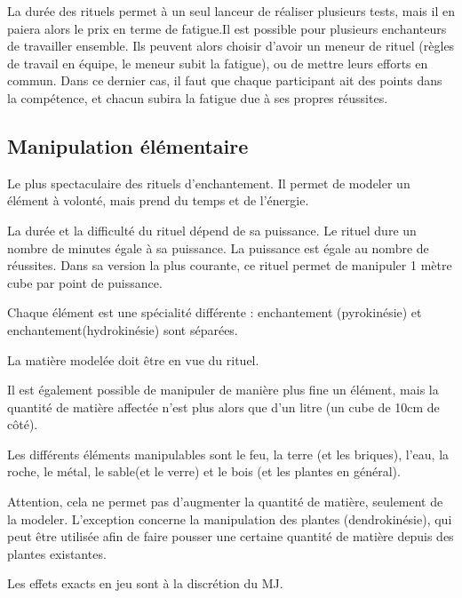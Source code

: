 \documentclass[10pt,a4paper,twocolumn]{book}
\begin{document}
La durée des rituels permet à un seul lanceur de réaliser plusieurs tests, mais il en paiera alors le prix en terme de fatigue.Il est possible pour plusieurs enchanteurs de travailler ensemble. Ils peuvent alors choisir d'avoir un meneur de rituel (règles de travail en équipe, le meneur subit la fatigue), ou de mettre leurs efforts en commun. Dans ce dernier cas, il faut que chaque participant ait des points dans la compétence, et chacun subira la fatigue due à ses propres réussites.
\subsection*{Manipulation élémentaire}
Le plus spectaculaire des rituels d'enchantement. Il permet de modeler un élément à volonté, mais prend du temps et de l'énergie.

La durée et la difficulté du rituel dépend de sa puissance. Le rituel dure un nombre de minutes égale à sa puissance. La puissance est égale au nombre de réussites. Dans sa version la plus courante, ce rituel permet de manipuler 1 mètre cube par point de puissance. 

 Chaque élément est une spécialité différente : enchantement (pyrokinésie) et enchantement(hydrokinésie) sont séparées.

La matière modelée doit être en vue du rituel. 

Il est également possible de manipuler de manière plus fine un élément, mais la quantité de matière affectée n'est plus alors que d'un litre (un cube de 10cm de côté).

Les différents éléments manipulables sont le feu, la terre (et les briques), l'eau, la roche, le métal, le sable(et le verre) et le bois (et les plantes en général).

Attention, cela ne permet pas d'augmenter la quantité de matière, seulement de la modeler. L'exception concerne la manipulation des plantes (dendrokinésie), qui peut être utilisée afin de faire pousser une certaine quantité de matière depuis des plantes existantes.

Les effets exacts en jeu sont à la discrétion du MJ. 
\end{document}
